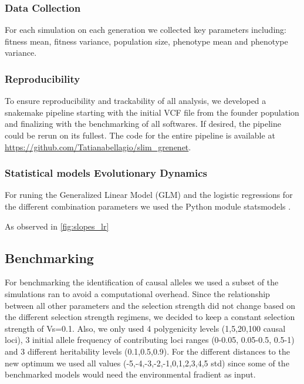 \documentclass{article}
\begin{document}
\subsubsection{Data Collection}
For each simulation on each generation we collected key parameters including: fitness mean, fitness variance, population size, phenotype mean and phenotype variance. 

\subsubsection{Reproducibility}
To ensure reproducibility and trackability of all analysis, we developed a snakemake \citep{Molder2021-ho} pipeline starting with the initial VCF file from the founder population and finalizing with the benchmarking of all softwares. If desired, the pipeline could be rerun on its fullest. The code for the entire pipeline is available at \url{https://github.com/Tatianabellagio/slim_grenenet}.

\subsubsection{Statistical models Evolutionary Dynamics}
For runing the Generalized Linear Model (GLM) and the logistic regressions for the different combination parameters we used the Python module statsmodels \citep{Seabold2010-ec}. 

As observed in \ref{fig:slopes_lr} 

\subsection{Benchmarking}

For benchmarking the identification of causal alleles we used a subset of the simulations ran to avoid a computational overhead. Since the relationship between all other parameters and the selection strength did not change based on the different selection strength regimens, we decided to keep a constant selection strength of Vs=0.1. Also, we only used 4 polygenicity levels (1,5,20,100 causal loci), 3 initial allele frequency of contributing loci ranges (0-0.05, 0.05-0.5, 0.5-1) and 3 different heritability levels (0.1,0.5,0.9). For the different distances to the new optimum we used all values (-5,-4,-3,-2,-1,0,1,2,3,4,5 std) since some of the benchmarked models would need the environmental fradient as input. 
\end{document}
